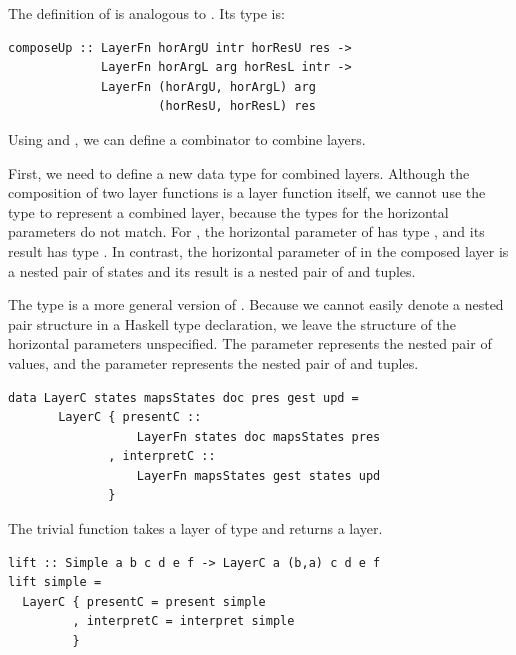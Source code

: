 \documentclass[preprint,natbib]{sigplanconf}
\begin{document}
The definition of  is analogous to . Its type is:

\begin{small}
\begin{verbatim}
composeUp :: LayerFn horArgU intr horResU res ->
             LayerFn horArgL arg horResL intr ->
             LayerFn (horArgU, horArgL) arg
                     (horResU, horResL) res
\end{verbatim}
\end{small}


Using  and , we can define a combinator to combine  layers. 


First, we need to define a new data type for combined layers. Although the composition of two layer functions is a layer function itself, we cannot use the type  to represent a combined layer, because the types for the horizontal parameters do not match.  For , the horizontal parameter of  has type , and its result has type . In contrast, the horizontal parameter of  in the composed layer is a nested pair of states and its result is a nested pair of  and  tuples. 

The type  is a more general version of . Because we cannot easily denote a nested pair structure in a Haskell type declaration, we leave the structure of the horizontal parameters unspecified. The parameter  represents the nested pair of  values, and the parameter  represents the nested pair of  and  tuples.

\begin{small}
\begin{verbatim}
data LayerC states mapsStates doc pres gest upd =
       LayerC { presentC ::   
                  LayerFn states doc mapsStates pres
              , interpretC :: 
                  LayerFn mapsStates gest states upd
              }
\end{verbatim}
\end{small}

The trivial function  takes a layer of type  and returns a  layer.

\begin{small}
\begin{verbatim}
lift :: Simple a b c d e f -> LayerC a (b,a) c d e f
lift simple = 
  LayerC { presentC = present simple
         , interpretC = interpret simple
         }
\end{verbatim}
\end{small}
\end{document}
